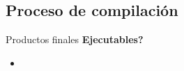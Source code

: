 
\subsection{Proceso de compilación}

\begin{frame}[fragile]{Productos finales}
\textbf{Ejecutables?}
  \begin{itemize}[<+(1)->]
  \item
 \end{itemize}
\end{frame}